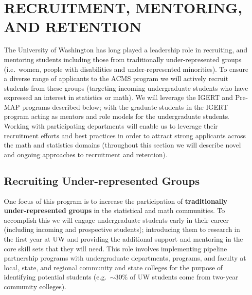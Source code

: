  \section{RECRUITMENT, MENTORING, AND RETENTION}
\vspace{-0.8em}
 The University of Washington has long played a leadership role in
 recruiting, and mentoring students including those from traditionally
 under-represented groups (i.e.\ women, people with disabilities
 and under-represented minorities). To ensure a diverse range of
 applicants to the ACMS program we will actively recruit students from
 these groups (targeting incoming undergraduate students
 who have expressed an interest in statistics or math).  We will
 leverage the IGERT and Pre-MAP programs described below; with the
 graduate students in the IGERT program acting as mentors and role
 models for the undergraduate students. Working with participating
 departments will enable us to leverage their recruitment efforts and
 best practices in order to attract strong applicants across the math
 and statistics domains (throughout this section we will describe
 novel and ongoing approaches to recruitment and retention).


\subsection{Recruiting Under-represented Groups}
 \vspace{-0.8em}
One focus of this program is to increase the participation of
\textbf{traditionally under-represented groups} in the statistical and
math communities. To accomplish this we will engage undergraduate
students early in their career (including incoming and prospective
students); introducing them to research in the first year at UW and
providing the additional support and mentoring in the core skill sets
that they will need.  This role involves implementing pipeline
partnership programs with undergraduate departments, programs, and
faculty at local, state, and regional community and state colleges for
the purpose of identifying potential students (e.g.\ $\sim$30\% of UW
students come from two-year community colleges). 


